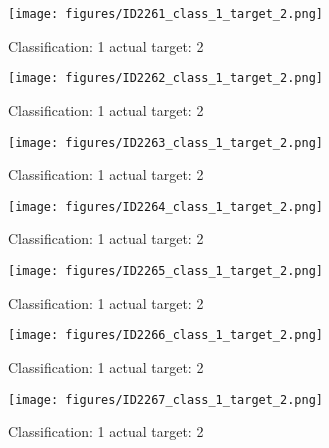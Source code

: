 \begin{figure}[h!]
\begin{center}
\texttt{[image: figures/ID2261\_class\_1\_target\_2.png]}
\end{center}
\caption{ Classification: 1 actual target: 2}
\label{fig:ID2261_class_1_target_2}
\end{figure}
\begin{figure}[h!]
\begin{center}
\texttt{[image: figures/ID2262\_class\_1\_target\_2.png]}
\end{center}
\caption{ Classification: 1 actual target: 2}
\label{fig:ID2262_class_1_target_2}
\end{figure}
\begin{figure}[h!]
\begin{center}
\texttt{[image: figures/ID2263\_class\_1\_target\_2.png]}
\end{center}
\caption{ Classification: 1 actual target: 2}
\label{fig:ID2263_class_1_target_2}
\end{figure}
\begin{figure}[h!]
\begin{center}
\texttt{[image: figures/ID2264\_class\_1\_target\_2.png]}
\end{center}
\caption{ Classification: 1 actual target: 2}
\label{fig:ID2264_class_1_target_2}
\end{figure}
\begin{figure}[h!]
\begin{center}
\texttt{[image: figures/ID2265\_class\_1\_target\_2.png]}
\end{center}
\caption{ Classification: 1 actual target: 2}
\label{fig:ID2265_class_1_target_2}
\end{figure}
\begin{figure}[h!]
\begin{center}
\texttt{[image: figures/ID2266\_class\_1\_target\_2.png]}
\end{center}
\caption{ Classification: 1 actual target: 2}
\label{fig:ID2266_class_1_target_2}
\end{figure}
\begin{figure}[h!]
\begin{center}
\texttt{[image: figures/ID2267\_class\_1\_target\_2.png]}
\end{center}
\caption{ Classification: 1 actual target: 2}
\label{fig:ID2267_class_1_target_2}
\end{figure}
